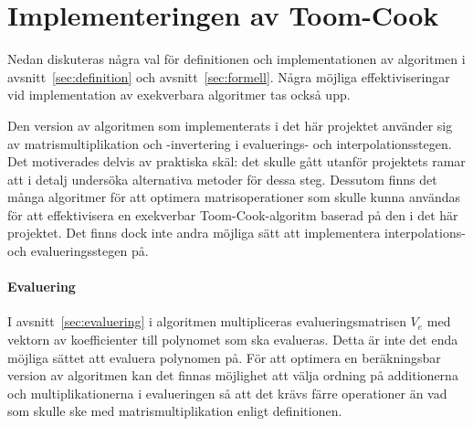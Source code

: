 \section{Implementeringen av Toom-Cook}

Nedan diskuteras några val för definitionen och implementationen av algoritmen i
avsnitt~\ref{sec:definition} och avsnitt~\ref{sec:formell}. Några möjliga
effektiviseringar vid implementation av exekverbara algoritmer tas också upp.

Den version av algoritmen som implementerats i det här projektet använder sig av
matrismultiplikation och -invertering i evaluerings- och interpolationsstegen.
Det motiverades delvis av praktiska skäl: det skulle gått utanför projektets
ramar att i detalj undersöka alternativa metoder för dessa steg.
Dessutom finns det många algoritmer för att optimera matrisoperationer som skulle kunna
användas för att effektivisera en exekverbar Toom-Cook-algoritm baserad på den i det här
projektet. Det finns dock inte andra möjliga sätt att implementera interpolations- och
evalueringsstegen på.




\paragraph{Evaluering}
I avsnitt~\ref{sec:evaluering} i algoritmen multipliceras
evalueringsmatrisen $V_e$ med vektorn av koefficienter till polynomet som ska
evalueras. Detta är inte det enda möjliga sättet att evaluera polynomen på.
För att optimera en beräkningsbar version av algoritmen kan det finnas möjlighet att
välja ordning på additionerna och multiplikationerna i evalueringen så att det
krävs färre operationer än vad som skulle ske med matrismultiplikation enligt
definitionen\cite{bodrato2007towards}.

